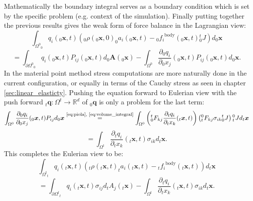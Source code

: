 \documentclass[m,times]{cgMA}
\begin{document}
Mathematically the boundary integral serves as a boundary condition which is set by the specific problem (e.g. context of the simulation). Finally putting together the previous results gives the weak form of force balance in the Lagrangian view:
$$
\int _ { \Omega ^ { 0 } } _0q _ { i } ( _0\boldsymbol { x } , t ) \left(_0\rho (_0\boldsymbol{x} , 0 ) _0a _{ i } (_0\boldsymbol{x} , t ) - {_0f_i} ^ {\text{body}}(_0\boldsymbol{x},t) {^t_0J}\right) d _0\boldsymbol{x}
$$
\begin{equation} \label{eq:lagr_force_bal}
  = \int _ { \partial \Omega ^ { 0 } } _0q _ { i } ( _0\boldsymbol { x } , t ) P _ {ij} ( _0\boldsymbol{x} , t)
  d_0\boldsymbol{A}(_0\boldsymbol{x})
  -\int _ { \Omega ^ { 0 } }  \frac{\partial _0q _ { i }}{\partial _0x_j} ( _0\boldsymbol { x } , t ) P _ {ij}( _0\boldsymbol{x} , t )
  d_0\boldsymbol{x}.
\end{equation}
In the material point method stress computations are more naturally done in the current configuration, or equally in terms of the Cauchy stress as seen in chapter \ref{sec:linear_elasticty}. Pushing the equation forward to Eulerian view with the push forward $_t\boldsymbol{q}:\Omega^t \rightarrow \mathbb{R}^d$ of $_0\boldsymbol{q}$ is only a problem for the last term:
$$
\int _ { \Omega ^ { 0 } }  \frac{\partial _0q _ { i }}{\partial _0x_j} ( _0\boldsymbol { x } , t ) P _ {ij} d_0\boldsymbol{x}
\stackrel{\text{\ref{eq:piola}, \ref{eq:volume_integral}}}{=}
\int _ { \Omega ^ { 0 } }  \left({^t_0}F_{kj}\frac{\partial _tq _ { i }}{\partial _tx_k} ( _t\boldsymbol { x } , t )\right) \left({_t^0}F_{kj} \sigma _ {ik} {_0^tJ}\right) {_t^0J} d_t\boldsymbol{x}
$$
\begin{equation}  =  \int _ { \Omega ^ { t } } \frac{\partial _tq _ { i }}{\partial _tx_k} ( _t\boldsymbol { x } , t )\sigma _ {ik} d_t\boldsymbol{x}.
\end{equation}
This completes the Eulerian view to be:
$$
\int _ { \Omega ^ { t } } _tq _ { i } ( _t\boldsymbol { x } , t ) \left(_t\rho (_t\boldsymbol{x} , t) _ta _{ i } (_t\boldsymbol{x} , t ) - {_tf_i} ^ {\text{body}}(_t\boldsymbol{x},t)\right) d _t\boldsymbol{x}
$$
\begin{equation}\label{eq:eul_force_bal}
  = \int _ { \partial \Omega ^ { t } } _tq _ { i } ( _t\boldsymbol { x } , t ) \sigma _ {ij} d_tA_j(_t\boldsymbol{x}) -  \int _ { \Omega ^ { t } } \frac{\partial _tq _ { i }}{\partial _tx_k} ( _t\boldsymbol { x } , t )\sigma _ {ik} d_t\boldsymbol{x}.
\end{equation}
\cite{MPM:COURSE}
\cite{strang2007computational}
\cite{bathe2006finite}
\end{document}
